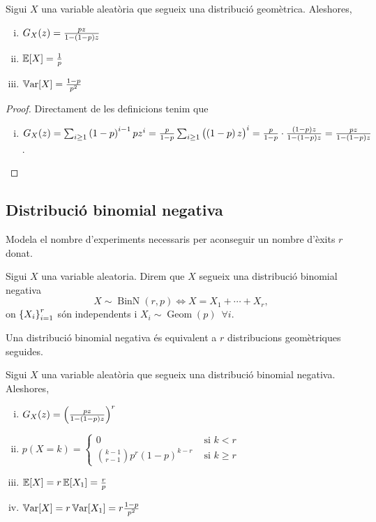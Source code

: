 \begin{prop}
    Sigui $X$ una variable aleatòria que segueix una distribució geomètrica. Aleshores,
    \begin{enumerate}[i)]
        \item $G_X(z) =  \frac{pz}{1-\left( 1-p\right) z}$
        \item $\operatorname{\mathbb{E}}[X] = \frac{1}{p}$
        \item $\operatorname{\mathbb{V}ar}[X] = \frac{1-p}{p^2}$
    \end{enumerate}
\end{prop}
\begin{proof}
  Directament de les definicions tenim que
  \begin{enumerate}[i)]
   \item $G_X(z) = \sum_{i\geq 1}\left( 1-p \right) ^{i-1}p z^i = \frac{p}{1-p}\sum_{i\geq 1}\left(\left( 1-p \right) z\right)^{i} = 
   \frac{p}{1-p}\cdot\frac{\left( 1-p \right) z}{1-\left( 1-p\right) z}= \frac{pz}{1-\left( 1-p\right) z}$.
  \end{enumerate}
\end{proof}

\subsection*{Distribució binomial negativa}

Modela el nombre d'experiments necessaris per aconseguir un nombre d'èxits $r$ donat.

\begin{defi}
    Sigui $X$ una variable aleatoria. Direm que $X$ segueix una distribució binomial negativa
    \[X \sim \operatorname{BinN}(r,p) \iff X = X_1 + \cdots + X_r,\]
    on $\left\{ X_i \right\}_{i=1}^{r}$ són independents i $X_i \sim \operatorname{Geom}(p) \enspace\forall i$.
\end{defi}

\begin{obs}
    Una distribució binomial negativa és equivalent a $r$ distribucions geomètriques seguides.
\end{obs}


\begin{prop}
    Sigui $X$ una variable aleatòria que segueix una distribució binomial negativa. Aleshores,
    \begin{enumerate}[i)]
        \item $G_X(z) = \left( \frac{pz}{1-\left( 1-p\right) z}\right)^r$
        \item $p(X=k) = \begin{cases}
                         0 &\text{ si } k < r\\
                         \binom{k-1}{r-1}p^{r}(1-p)^{k-r} & \text{ si }k\geq r
                        \end{cases}$
        \item $\operatorname{\mathbb{E}}[X] = r\operatorname{\mathbb{E}}[X_1] = \frac{r}{p}$
        \item $\operatorname{\mathbb{V}ar}[X] = r\operatorname{\mathbb{V}ar}[X_1] = r\frac{1-p}{p^2}$
    \end{enumerate}
\end{prop}


